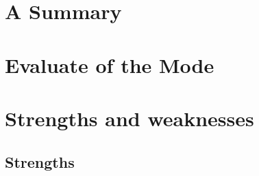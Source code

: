 \documentclass{mcmthesis}
\begin{document}
\section{A Summary}

\section{Evaluate of the Mode}

\section{Strengths and weaknesses}

\subsection{Strengths}






\end{document}
